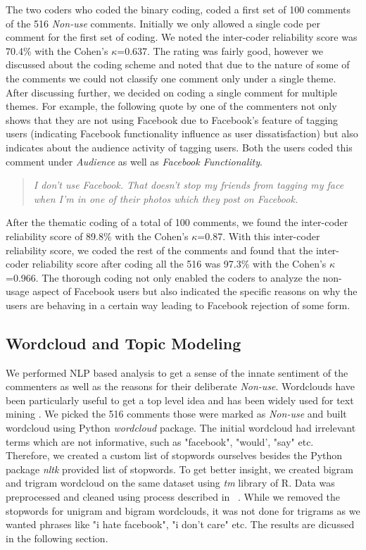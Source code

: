 The two coders who coded the binary coding, coded a first set of 100 comments of the 516 \emph{Non-use} comments.  Initially we only allowed a single code per comment for the first set of coding. We noted the inter-coder reliability score was 70.4\% with the Cohen's $\kappa$=0.637. The rating was fairly good, however we discussed about the coding scheme and noted that due to the nature of some of the comments we could not classify one comment only under a single theme. After discussing further, we decided on coding a single comment for multiple themes. For example, the following quote by one of the commenters not only shows that they are not using Facebook due to Facebook's feature of tagging users (indicating Facebook functionality influence as user dissatisfaction) but also indicates about the audience activity of tagging users. Both the users coded this comment under \textit{Audience} as well as \textit{Facebook Functionality}.
\begin{quote}
\textit{I don't use Facebook. That doesn't stop my friends from tagging my face when I'm in one of their photos which they post on Facebook.}
\end{quote}
After the thematic coding of a total of 100 comments, we found the inter-coder reliability score of 89.8\% with the Cohen's $\kappa$=0.87. With this inter-coder reliability score, we coded the rest of the comments and found that the inter-coder reliability score after coding all the 516 was 97.3\% with the Cohen's $\kappa$=0.966. The thorough coding not only enabled the coders to analyze the non-usage aspect of Facebook users but also indicated the specific reasons on why the users are behaving in a certain way leading to Facebook rejection of some form. 

\subsection{Wordcloud and Topic Modeling}
We performed NLP based analysis to get a sense of the innate sentiment of the commenters as well as the reasons for their deliberate \textit{Non-use}. Wordclouds have been particularly useful to get a top level idea and has been widely used for text mining \cite{younis2015sentiment}. We picked the 516 comments those were marked as \textit{Non-use} and built wordcloud using Python \textit{wordcloud} package. The initial wordcloud had irrelevant terms which are not informative, such as "facebook", "would', "say" etc. Therefore, we created a custom list of stopwords ourselves besides the Python package \textit{nltk} provided list of stopwords. To get better insight, we created bigram and trigram wordcloud on the same dataset using \textit{tm} library of R. Data was preprocessed and cleaned using process described in ~\cite{wang2013gender}. While we removed the stopwords for unigram and bigram wordclouds, it was not done for trigrams as we wanted phrases like "i hate facebook", "i don't care" etc. The results are dicussed in the following section.


